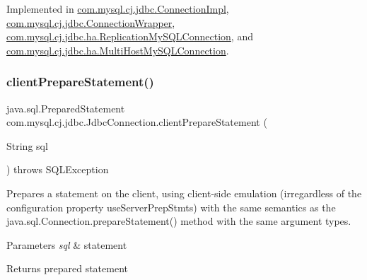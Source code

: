 Implemented in \mbox{\hyperlink{classcom_1_1mysql_1_1cj_1_1jdbc_1_1_connection_impl_ac4217c85e8137986c58604454de14cfd}{com.\+mysql.\+cj.\+jdbc.\+Connection\+Impl}}, \mbox{\hyperlink{classcom_1_1mysql_1_1cj_1_1jdbc_1_1_connection_wrapper_a8279c8cf76edfd6247bf3d3e2a969cae}{com.\+mysql.\+cj.\+jdbc.\+Connection\+Wrapper}}, \mbox{\hyperlink{classcom_1_1mysql_1_1cj_1_1jdbc_1_1ha_1_1_replication_my_s_q_l_connection_aa198df19289a6a2ba3ae72ec55c10f62}{com.\+mysql.\+cj.\+jdbc.\+ha.\+Replication\+My\+S\+Q\+L\+Connection}}, and \mbox{\hyperlink{classcom_1_1mysql_1_1cj_1_1jdbc_1_1ha_1_1_multi_host_my_s_q_l_connection_a1de3c2673c06d90de1baee65b7607ef0}{com.\+mysql.\+cj.\+jdbc.\+ha.\+Multi\+Host\+My\+S\+Q\+L\+Connection}}.

\mbox{\label{interfacecom_1_1mysql_1_1cj_1_1jdbc_1_1_jdbc_connection_a62db1ccf7a070833775481acb5e9e359}} 
\subsubsection{\texorpdfstring{client\+Prepare\+Statement()}{clientPrepareStatement()}\hspace{0.1cm}{\footnotesize\ttfamily [1/6]}}
{\footnotesize\ttfamily java.\+sql.\+Prepared\+Statement com.\+mysql.\+cj.\+jdbc.\+Jdbc\+Connection.\+client\+Prepare\+Statement (\begin{DoxyParamCaption}\item[{String}]{sql }\end{DoxyParamCaption}) throws S\+Q\+L\+Exception}

Prepares a statement on the client, using client-\/side emulation (irregardless of the configuration property \textquotesingle{}use\+Server\+Prep\+Stmts\textquotesingle{}) with the same semantics as the java.\+sql.\+Connection.\+prepare\+Statement() method with the same argument types.


\begin{DoxyParams}{Parameters}
{\em sql} & statement \\
\hline
\end{DoxyParams}
\begin{DoxyReturn}{Returns}
prepared statement 
\end{DoxyReturn}

